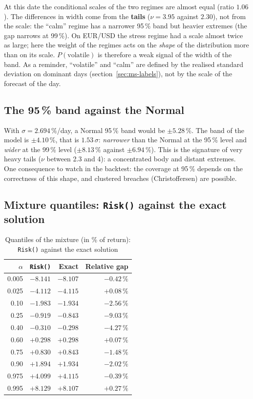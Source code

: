 \documentclass[12pt,a4paper]{article}
\begin{document}
At this date the conditional scales of the two regimes are almost equal (ratio $1.06$). The differences in width come from the \textbf{tails} ($\nu = 3.95$ against $2.30$), not from the scale: the ``calm'' regime has a narrower 95\,\% band but heavier extremes (the gap narrows at 99\,\%). On EUR/USD the stress regime had a scale almost twice as large; here the weight of the regimes acts on the \emph{shape} of the distribution more than on its scale. $P(\text{volatile})$ is therefore a weak signal of the width of the band. As a reminder, ``volatile'' and ``calm'' are defined by the realised standard deviation on dominant days (section~\ref{sec:ms-labels}), not by the scale of the forecast of the day.

\subsection{The 95\,\% band against the Normal}

With $\sigma = 2.694\,\%$/day, a Normal 95\,\% band would be $\pm5.28\,\%$. The band of the model is $\pm4.10\,\%$, that is $1.53\,\sigma$: \emph{narrower} than the Normal at the 95\,\% level and \emph{wider} at the 99\,\% level ($\pm 8.13\,\%$ against $\pm 6.94\,\%$). This is the signature of very heavy tails ($\nu$ between 2.3 and 4): a concentrated body and distant extremes. One consequence to watch in the backtest: the coverage at 95\,\% depends on the correctness of this shape, and clustered breaches (Christoffersen) are possible.

\subsection{Mixture quantiles: \texttt{Risk()} against the exact solution}

\begin{table}[H]
	\centering
	\caption{Quantiles of the mixture (in \% of return): \texttt{Risk()} against the exact solution}
	\label{tab:range-mixture}
	\begin{tabular}{rrrr}
		\toprule
		$\alpha$ & \texttt{Risk()} & Exact & Relative gap \\
		\midrule
		0.005 & $-8.141$ & $-8.107$ & $-0.42\,\%$ \\
		0.025 & $-4.112$ & $-4.115$ & $+0.08\,\%$ \\
		0.10 & $-1.983$ & $-1.934$ & $-2.56\,\%$ \\
		0.25 & $-0.919$ & $-0.843$ & $-9.03\,\%$ \\
		0.40 & $-0.310$ & $-0.298$ & $-4.27\,\%$ \\
		0.60 & $+0.298$ & $+0.298$ & $+0.07\,\%$ \\
		0.75 & $+0.830$ & $+0.843$ & $-1.48\,\%$ \\
		0.90 & $+1.894$ & $+1.934$ & $-2.02\,\%$ \\
		0.975 & $+4.099$ & $+4.115$ & $-0.39\,\%$ \\
		0.995 & $+8.129$ & $+8.107$ & $+0.27\,\%$ \\
		\bottomrule
	\end{tabular}
\end{table}
\end{document}
